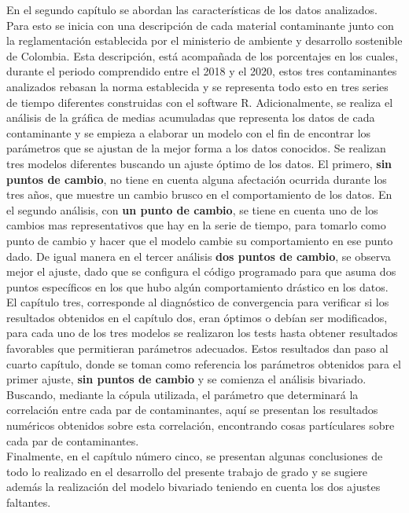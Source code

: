 En el segundo capítulo se abordan las características de los datos analizados. Para esto se inicia con una descripción de cada material contaminante junto con la reglamentación establecida por el ministerio de ambiente y desarrollo sostenible de Colombia. Esta descripción, está acompañada de los porcentajes en los cuales, durante el periodo comprendido entre el 2018 y el 2020, estos tres contaminantes analizados rebasan la norma establecida y se representa todo esto en tres series de tiempo diferentes construidas con el software R. Adicionalmente, se realiza el análisis de la gráfica de medias acumuladas que representa los datos de cada contaminante y se empieza a elaborar un modelo con el fin de encontrar los parámetros que se ajustan de la mejor forma a los datos conocidos. Se realizan tres modelos diferentes buscando un ajuste óptimo de los datos. El primero, \textbf{sin puntos de cambio}, no tiene en cuenta alguna afectación ocurrida durante los tres años, que muestre un cambio brusco en el comportamiento de los datos. En el segundo análisis, con \textbf{un punto de cambio}, se tiene en cuenta uno de los cambios mas representativos que hay en la serie de tiempo, para tomarlo como punto de cambio y hacer que el modelo cambie su comportamiento en ese punto dado. De igual manera en el tercer análisis \textbf{dos puntos de cambio}, se observa mejor el ajuste, dado que se configura el código programado para que asuma dos puntos específicos en los que hubo algún comportamiento drástico en los datos.\\

El capítulo tres, corresponde al diagnóstico de convergencia para verificar si los resultados obtenidos en el capítulo dos, eran óptimos o debían ser modificados, para cada uno de los tres modelos se realizaron los tests hasta obtener resultados favorables que permitieran parámetros adecuados. Estos resultados dan paso al cuarto capítulo, donde se toman como referencia los parámetros obtenidos para el primer ajuste, \textbf{sin puntos de cambio} y se comienza el análisis bivariado. Buscando, mediante la cópula utilizada, el parámetro que determinará la correlación entre cada par de contaminantes, aquí se presentan los resultados numéricos obtenidos sobre esta correlación, encontrando cosas partículares sobre cada par de contaminantes. \\

Finalmente, en el capítulo número cinco, se presentan algunas conclusiones de todo lo realizado en el desarrollo del presente trabajo de grado y se sugiere además la realización del modelo bivariado teniendo en cuenta los dos ajustes faltantes. 